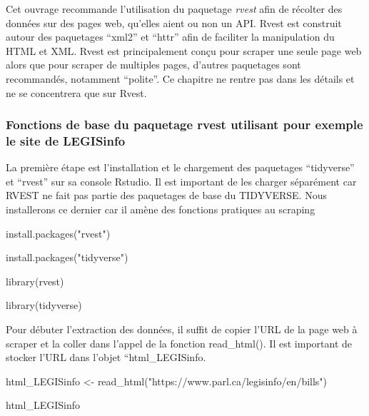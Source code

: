 \documentclass[
  letterpaper,
  DIV=11,
  numbers=noendperiod]{scrreprt}
\newenvironment{Shaded}{\begin{snugshade}}{\end{snugshade}}
\newcommand{\ErrorTok}[1]{\textcolor[rgb]{0.68,0.00,0.00}{#1}}
\newcommand{\ExtensionTok}[1]{\textcolor[rgb]{0.00,0.23,0.31}{#1}}
\newcommand{\KeywordTok}[1]{\textcolor[rgb]{0.00,0.23,0.31}{#1}}
\newcommand{\NormalTok}[1]{\textcolor[rgb]{0.00,0.23,0.31}{#1}}
\newcommand{\OperatorTok}[1]{\textcolor[rgb]{0.37,0.37,0.37}{#1}}
\newcommand{\StringTok}[1]{\textcolor[rgb]{0.13,0.47,0.30}{#1}}
\begin{document}
Cet ouvrage recommande l'utilisation du paquetage \emph{rvest} afin de
récolter des données sur des pages web, qu'elles aient ou non un API.
Rvest est construit autour des paquetages ``xml2'' et ``httr'' afin de
faciliter la manipulation du HTML et XML. Rvest est principalement conçu
pour scraper une seule page web alors que pour scraper de multiples
pages, d'autres paquetages sont recommandés, notamment ``polite''. Ce
chapitre ne rentre pas dans les détails et ne se concentrera que sur
Rvest.

\subsubsection{\texorpdfstring{\textbf{Fonctions de base du paquetage
rvest utilisant pour exemple le site de
LEGISinfo}}{Fonctions de base du paquetage rvest utilisant pour exemple le site de LEGISinfo}}\label{fonctions-de-base-du-paquetage-rvest-utilisant-pour-exemple-le-site-de-legisinfo}

La première étape est l'installation et le chargement des paquetages
``tidyverse'' et ``rvest'' sur sa console Rstudio. Il est important de
les charger séparément car RVEST ne fait pas partie des paquetages de
base du TIDYVERSE. Nous installerons ce dernier car il amène des
fonctions pratiques au scraping

\begin{Shaded}
\begin{Highlighting}[]
\ExtensionTok{install.packages}\ErrorTok{(}\StringTok{"rvest"}\KeywordTok{)}

\ExtensionTok{install.packages}\ErrorTok{(}\StringTok{"tidyverse"}\KeywordTok{)}

\ExtensionTok{library}\ErrorTok{(}\ExtensionTok{rvest}\KeywordTok{)}

\ExtensionTok{library}\ErrorTok{(}\ExtensionTok{tidyverse}\KeywordTok{)}
\end{Highlighting}
\end{Shaded}

Pour débuter l'extraction des données, il suffit de copier l'URL de la
page web à scraper et la coller dans l'appel de la fonction
read\_html(). Il est important de stocker l'URL dans l'objet
``html\_LEGISinfo.

\begin{Shaded}
\begin{Highlighting}[]
\ExtensionTok{html\_LEGISinfo} \OperatorTok{\textless{}}\NormalTok{{-} read\_html}\ErrorTok{(}\StringTok{"https://www.parl.ca/legisinfo/en/bills"}\KeywordTok{)}

\ExtensionTok{html\_LEGISinfo}
\end{Highlighting}
\end{Shaded}
\end{document}
